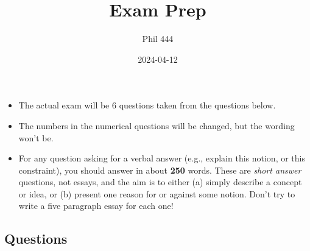 \documentclass[
  12pt,
  letterpaper,
  DIV=11,
  numbers=noendperiod]{scrartcl}
\title{Exam Prep}
\author{Phil 444}
\date{2024-04-12}
\providecommand{\tightlist}{%
  \setlength{\itemsep}{0pt}\setlength{\parskip}{0pt}}\usepackage{longtable,booktabs,array}
\begin{document}
\maketitle

\begin{itemize}
\tightlist
\item
  The actual exam will be 6 questions taken from the questions below.
\item
  The numbers in the numerical questions will be changed, but the
  wording won't be.
\item
  For any question asking for a verbal answer (e.g., explain this
  notion, or this constraint), you should answer in about \textbf{250}
  words. These are \emph{short answer} questions, not essays, and the
  aim is to either (a) simply describe a concept or idea, or (b) present
  one reason for or against some notion. Don't try to write a five
  paragraph essay for each one!
\end{itemize}

\subsection*{Questions}\label{questions}
\end{document}
